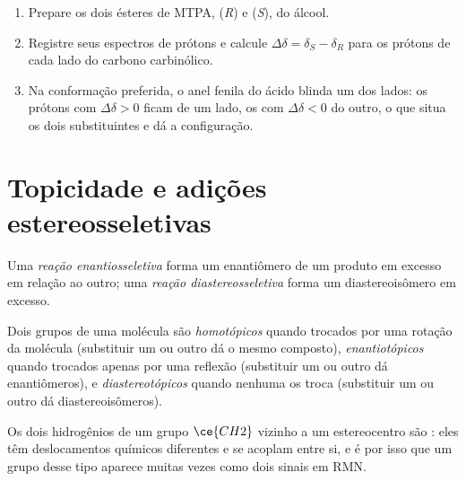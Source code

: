\begin{method}\label{met:b3:asymmetric-synthesis:mosher}
\begin{enumerate}
  \item Prepare os dois ésteres de MTPA, (\textit{R}) e (\textit{S}), do álcool.
  \item Registre seus espectros de prótons e calcule $\Delta\delta = \delta_S - \delta_R$ para os prótons de cada
        lado do carbono carbinólico.
  \item Na conformação preferida, o anel fenila do ácido blinda um dos lados:
        os prótons com $\Delta\delta > 0$ ficam de um lado, os com $\Delta\delta < 0$ do outro, o que
        situa os dois substituintes e dá a configuração.
\end{enumerate}
\end{method}

\section{Topicidade e adições estereosseletivas}

\begin{definition}\label{def:b3:asymmetric-synthesis:selective}
Uma \emph{reação enantiosseletiva} forma um
enantiômero de um produto em excesso em relação ao outro; uma \emph{reação
diastereosseletiva} forma um diastereoisômero em excesso.
\end{definition}

\begin{definition}[Topicidade]\label{def:b3:asymmetric-synthesis:topicity}
Dois grupos de uma molécula são \emph{homotópicos} quando trocados por
uma rotação da molécula (substituir um ou outro dá o mesmo composto),
\emph{enantiotópicos} quando trocados apenas por uma reflexão
(substituir um ou outro dá enantiômeros), e
\emph{diastereotópicos} quando nenhuma  os troca
(substituir um ou outro dá diastereoisômeros).
\end{definition}

Os dois hidrogênios de um grupo $\ce{CH2}$ vizinho a um estereocentro são : eles
têm deslocamentos químicos diferentes e se acoplam entre si, e é por isso que um grupo desse tipo
aparece muitas vezes como dois sinais em RMN.

